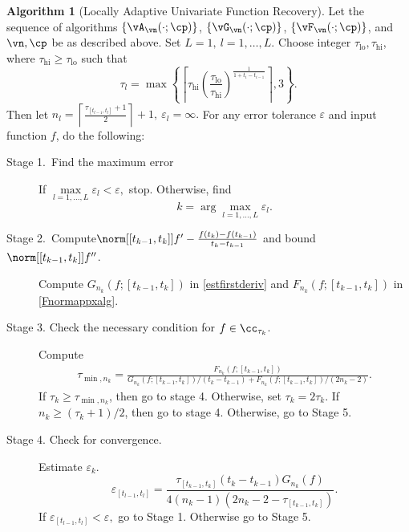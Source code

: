\documentclass[]{elsarticle}
\DeclareMathOperator{\lo}{lo}
\DeclareMathOperator{\err}{err}
\theoremstyle{definition}
\newtheorem{algo}{Algorithm}
\theoremstyle{remark}
\begin{document}


\begin{algo}[Locally Adaptive Univariate Function Recovery] \label{multistageapproalgo}
Let the sequence of algorithms $\{\vA_{\vn}(\cdot;\cp)\}$, $\{\vG_{\vn}(\cdot;\cp)\}$,  $\{\vF_{\vn}(\cdot;\cp)\}$, and $\vn, \cp$  be as described above. Set $L=1, \ l =1,\ldots,L$.
Choose integer $\tau_{\lo}, \tau_{\text{hi}}$, where $\tau_{\text{hi}} \ge \tau_{\lo}$ such that
$$\tau_l = \max\left\{ \left\lceil \tau_{\text{hi}} \left(\frac{\tau_{\lo}}{\tau_{\text{hi}}}\right)^{\frac{1}{1+t_i-t_{i-1}}} \right\rceil ,3\right\}.$$
Then let $n_l= \left\lceil\frac{\tau_{[t_{l-1},t_l]}+1}{2}  \right\rceil+1, \ \varepsilon_l=\infty.$ For any error tolerance $\varepsilon$ and input function $f$, do the following:
\begin{description}
\item[Stage 1.\ Find the maximum error] If $\max\limits_{l=1,\ldots,L}\varepsilon_l < \varepsilon,$ stop.
Otherwise, find
$$k = \arg\max\limits_{l=1,\ldots,L}\varepsilon_l.$$
\item[Stage 2.\ Compute{$\norm[{[t_{k-1},t_k]}]{f'-\frac{f(t_k)-f(t_{k-1})}{t_k-t_{k-1}}}$} and bound {$\norm[{[t_{k-1},t_k]}]{f''}$}.] Compute $G_{n_k}(f;{[t_{k-1},t_k]})$ in \eqref{estfirstderiv} and $F_{n_k}(f;{[t_{k-1},t_k]})$ in \eqref{Fnormappxalg}.
\item[Stage 3. Check the necessary condition for $f \in \cc_{\tau_k}$.] Compute
    \begin{align*}
     \tau_{\min,n_k} =  \frac{F_{n_k}(f;{[t_{k-1},t_k]})}{G_{n_k}(f;{[t_{k-1},t_k]})/(t_k-t_{k-1})+F_{n_k}(f;{[t_{k-1},t_k]})/(2n_k-2)}.
    \end{align*}
If $\tau_k \ge \tau_{\min,n_k}$, then go to stage 4.  Otherwise, set $\tau_k = 2\tau_k$.  If $n_k \ge (\tau_k+1)/2$, then go to stage 4.  Otherwise, go to Stage 5.
\item[Stage 4. Check for convergence.] Estimate $\varepsilon_k.$
$$\varepsilon_{[t_{l-1},t_l]}=\frac{\tau_{[t_{k-1},t_k]}(t_k-t_{k-1})G_{n_k}(f)}{4(n_k-1)(2n_k-2 - \tau_{[t_{k-1},t_k]})}.$$
If $\varepsilon_{[t_{l-1},t_l]} < \varepsilon ,$ go to Stage 1. Otherwise go to Stage 5.

\end{description}
\end{algo}
\end{document}
